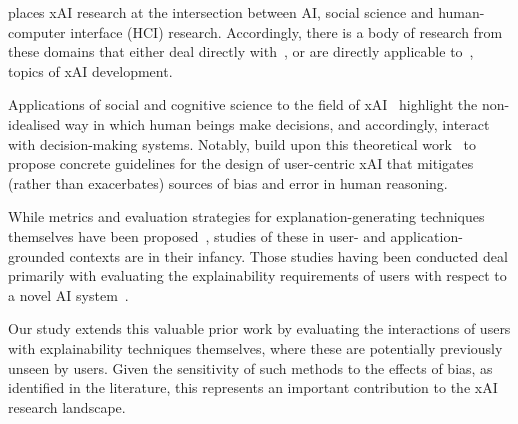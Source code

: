 \citet{miller2019explanation} places xAI research at the intersection between AI, social science and human-computer interface (HCI) research. Accordingly, there is a body of research from these domains that either deal directly with~\cite{abdul2020cogam, holzinger2013human}, or are directly applicable to~\cite{nielsen2005ten}, topics of xAI development.

Applications of social and cognitive science to the field of xAI~\cite{de2017people, miller2019explanation, lipton2018mythos, jussupow2021augmenting} highlight the non-idealised way in which human beings make decisions, and accordingly, interact with decision-making systems. Notably, \citet{wang_designing_2019} build upon this theoretical work~\cite{hoffman2017explainingpart1,hoffman2017explainingpart2, klein2018explainingpart3, hoffman2018explainingpart4} to propose concrete guidelines for the design of user-centric xAI that mitigates (rather than exacerbates) sources of bias and error in human reasoning.

While metrics and evaluation strategies for explanation-generating techniques themselves have been proposed~\cite{doshi2017towards, HolzingerEtAl:2019:Wiley-Paper, HolzingerEtAl:2020:QualityOfExplanations}, studies of these in user- and application-grounded contexts are in their infancy. Those studies having been conducted deal primarily with evaluating the explainability requirements of users with respect to a novel AI system~\cite{liao2020questioning, cai2019hello}. 


Our study extends this valuable prior work by evaluating the interactions of users with explainability techniques themselves, where these are potentially previously unseen by users. Given the sensitivity of such methods to the effects of bias, as identified in the literature, this represents an important contribution to the xAI research landscape.


